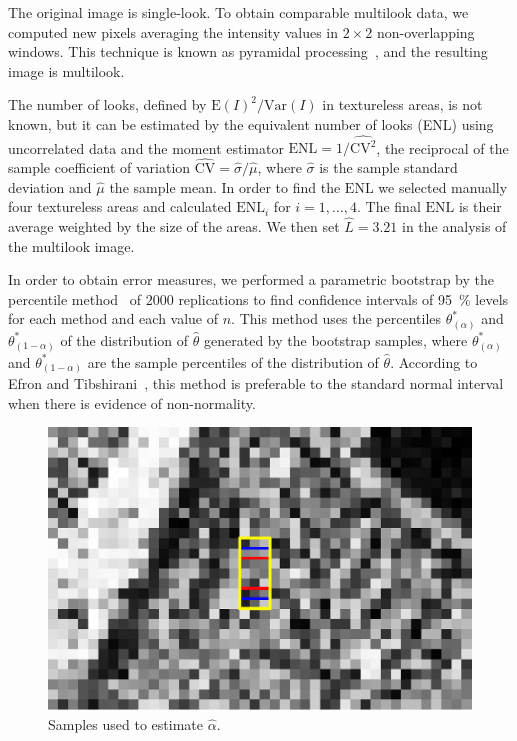 \documentclass[twocolumn]{svjour3}
\begin{document}
The original image is single-look.
To obtain comparable multilook data, we computed new pixels averaging the intensity values in $2\times2$ non-overlapping windows. This technique is known as pyramidal processing~\cite{Adelson1984}, and the resulting image is multilook.

The number of looks, defined by ${\text{E}(I)^2}/{\text{Var}(I)}$ in textureless areas, is not known, but it can be estimated by the equivalent number of looks (ENL) using uncorrelated data and the moment estimator
$\text{ENL}={1}/{\widehat{\text{CV}^2}}$, the reciprocal of the sample coefficient of variation $\widehat{\text{CV}}={\widehat{\sigma}}/{\widehat\mu}$, where $\widehat{\sigma}$ is the sample standard deviation and $\widehat\mu$ the sample mean.
In order to find the $\text{ENL}$ we selected manually four textureless areas and calculated $\text{ENL}_i$ for $i=1, \ldots, 4$. 
The final $\text{ENL}$ is their average weighted by the size of the areas. 
We then set $\widehat L=3.21$ in the analysis of the multilook image.

In order to obtain error measures, we performed a parametric bootstrap by the percentile method~\cite{Davison1997} of $2000$ replications to find confidence intervals of \SI{95}{\percent} levels for each method and each value of $n$.     
This method uses the percentiles $\theta^*_{(\alpha)}$ and $\theta^*_{(1-\alpha)}$ of the distribution of $\widehat{\theta} $ generated by the bootstrap samples, where $\theta^*_{(\alpha)}$ and $\theta^*_{(1-\alpha)}$ are the sample percentiles of the distribution of $\widehat{\theta} $. 
According to Efron and Tibshirani~\cite{Efron93}, this method is preferable to the standard normal interval when there is evidence of non-normality.

\begin{figure}[hbt]
	\centering
	\includegraphics[width=0.8\linewidth]{../../../Figures/PaperTesis/TresMuestrasAgrandada.eps}
	\caption{Samples used to estimate $\widehat{\alpha}$.}\label{TresMuestras} 
\end{figure}
\end{document}
